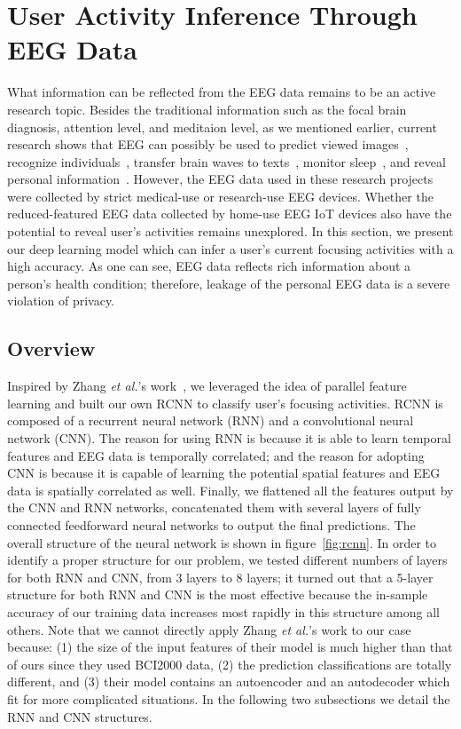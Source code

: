 \section{User Activity Inference Through EEG Data}
\label{sec:inference}

What information can be reflected from the EEG data remains to be an active research topic. Besides the traditional information such as the focal brain diagnosis, attention level, and meditaion level, as we mentioned earlier, current research shows that EEG can possibly be used to predict viewed images~\cite{mindreading2017}, recognize individuals~\cite{chu2017individual}, transfer brain waves to texts~\cite{zhang2017converting}, monitor sleep~\cite{nakamura2017automatic},  and reveal personal information~\cite{martinovic2012feasibility}. However, the EEG data used in these research projects were collected by strict medical-use or research-use EEG devices. Whether the reduced-featured EEG data collected by home-use EEG IoT devices also have the potential to reveal user's activities remains unexplored. In this section, we present our deep learning model which can infer a user's current focusing activities with a high accuracy. As one can see, EEG data reflects rich information about a person's health condition; therefore, leakage of the personal EEG data is a severe violation of privacy.

\subsection{Overview}
Inspired by Zhang \emph{et al.}'s work~\cite{zhang2017converting,hochreiter1997long}, we leveraged the idea of parallel feature learning and built our own RCNN to classify user's focusing activities. RCNN is composed of a recurrent neural network (RNN) and a convolutional neural network (CNN). The reason for using RNN is because it is able to learn temporal features and EEG data is temporally correlated; and the reason for adopting CNN is because it is capable of learning the potential spatial features and EEG data is spatially correlated as well. Finally, we flattened all the features output by the CNN and RNN networks, concatenated them with several layers of fully connected feedforward neural networks to output the final predictions. The overall structure of the neural network is shown in figure~\ref{fig:rcnn}. In order to identify a proper structure for our problem, we tested different numbers of layers for both RNN and CNN, from 3 layers to 8 layers; it turned out that a 5-layer structure for both RNN and CNN is the most effective because the in-sample accuracy of our training data increases most rapidly in this structure among all others. Note that we cannot directly apply Zhang \emph{et al.}'s work to our case because: (1) the size of the input features of their model is much higher than that of ours since they used BCI2000 data, (2) the prediction classifications are totally different, and (3) their model contains an autoencoder and an autodecoder which fit for more complicated situations. %
In the following two subsections we detail the RNN and CNN structures. 

